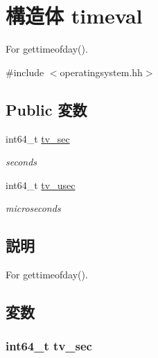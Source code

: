 \hypertarget{structOperatingSystem_1_1timeval}{
\section{構造体 timeval}
\label{structOperatingSystem_1_1timeval}
}


For gettimeofday().  


{\ttfamily \#include $<$operatingsystem.hh$>$}\subsection*{Public 変数}
\begin{DoxyCompactItemize}
\item 
int64\_\-t \hyperlink{structOperatingSystem_1_1timeval_ade91ea7e70df7db611d15bdda30a6dd9}{tv\_\-sec}
\begin{DoxyCompactList}\small\item\em seconds \item\end{DoxyCompactList}\item 
int64\_\-t \hyperlink{structOperatingSystem_1_1timeval_a73863c3643de3f79fefa8b4d6d3cfaa8}{tv\_\-usec}
\begin{DoxyCompactList}\small\item\em microseconds \item\end{DoxyCompactList}\end{DoxyCompactItemize}


\subsection{説明}
For gettimeofday(). 

\subsection{変数}
\hypertarget{structOperatingSystem_1_1timeval_ade91ea7e70df7db611d15bdda30a6dd9}{
\subsubsection[{tv\_\-sec}]{\setlength{\rightskip}{0pt plus 5cm}int64\_\-t {\bf tv\_\-sec}}}
\label{structOperatingSystem_1_1timeval_ade91ea7e70df7db611d15bdda30a6dd9}


